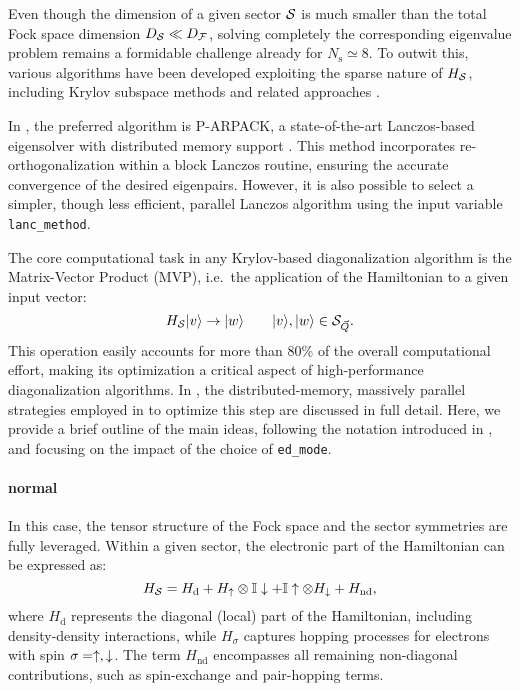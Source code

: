 \documentclass[edipack2.tex]{subfiles}
\begin{document}
Even though the dimension of a given sector ${\cal S}$ is much smaller than the
total Fock space dimension $D_{\cal S} \ll D_{\cal F}$, solving completely the
corresponding eigenvalue problem remains a formidable challenge
already for $N_\mathrm{s}\simeq 8$.
To outwit this, various
algorithms have been developed exploiting the sparse nature of
$H_{\cal S}$, including Krylov subspace methods and related approaches
\cite{Lanczos,Arnoldi,Feast}.

In \NAME, the preferred algorithm is P-ARPACK, a state-of-the-art
Lanczos-based eigensolver with distributed memory support
\cite{P-Arpack}. This method incorporates re-orthogonalization within
a block Lanczos routine, ensuring the accurate convergence of the
desired eigenpairs. However, it is also possible to select a simpler,
though less efficient, parallel Lanczos algorithm using the input
variable {\tt lanc\_method}.

The core computational task in any Krylov-based diagonalization
algorithm is the Matrix-Vector Product (MVP), i.e.~the application
of the Hamiltonian to a given input vector:
\begin{equation}
H_{\cal S} |v\rangle \to |w\rangle\qquad |v\rangle,|w\rangle\in {\cal S}_{\vec{Q}}.
\end{equation}
This operation easily accounts for more than 80\% of the overall
computational effort, making its optimization a critical aspect of
high-performance diagonalization algorithms. In ,
the distributed-memory, massively parallel strategies employed in \NAME
to optimize this step are discussed in full detail. Here, we provide
a brief outline of the main ideas, following the notation introduced
in , and focusing on the impact of the choice
of {\tt ed\_mode}.




\paragraph{\bf normal}
In this case, the tensor structure of the Fock space and the sector
symmetries are fully leveraged. Within a given sector, the electronic
part of the Hamiltonian can be expressed as:
\begin{equation}
H_{\cal S} = H_\mathrm{d} + H_\uparrow\otimes \mathbb{I}\downarrow + \mathbb{I}\uparrow\otimes
H_\downarrow + H_\mathrm{nd},
\label{HssNormal}
\end{equation}
where $H_\mathrm{d}$ represents the diagonal (local) part of the
Hamiltonian, including density-density interactions, while
$H_\sigma$ captures hopping processes for electrons with spin
$\sigma=\uparrow,\downarrow$. The term $H_\mathrm{nd}$ encompasses all remaining
non-diagonal contributions, such as spin-exchange and pair-hopping
terms.
\end{document}
